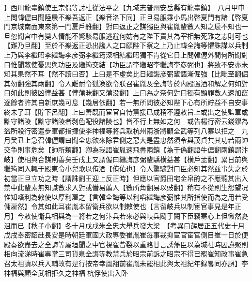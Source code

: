 】西川龍臺鎮使王宗侃等討杜從法平之【九域志普州安岳縣有龍臺鎮】　八月甲申上問韓偓曰聞陸扆不樂吾返正【樂音洛下同】正旦易服乘小馬出啓夏門有諸【啓夏門京城南面東來第一門夏戶雅翻】對曰返正之謀獨臣與崔胤輩數人知之扆不知也一旦忽聞宫中有變人情能不驚駭易服逃避何妨有之陛下責其為宰相無死難之志則可也【難乃旦翻】至於不樂返正恐出讒人之口願陛下察之上乃止韓全誨等懼誅謀以兵制上乃與李繼昭李繼誨李彦弼李繼筠深相結繼昭獨不肯從它日上問韓偓外間何所聞對曰惟聞敕使憂愳與功臣及繼筠交結【功臣謂李繼昭李繼誨李彦弼也】將致不安亦未知其果然不耳【然不讀曰否】上曰是不虛矣比日繼誨彦弼輩語漸倔強【比毗至翻倔其勿翻強其兩翻】令人難耐令狐渙欲令朕召崔胤及全誨等於内殿置酒和解之何如對曰如此則彼凶悖益甚【悖蒲昧翻又蒲没翻】上曰為之奈何對曰獨有顯罪數人速加竄逐餘者許其自新庶幾可息【幾居依翻】若一無所問彼必知陛下心有所貯益不自安事終未了耳【貯下呂翻】上曰善既而宦官自恃黨援已成稍不遵敕旨上或出之使監軍或黜守諸陵【黜守諸陵者剥色配役諸陵也】皆不行上無如之何　或告楊行密云錢鏐為盜所殺行密遣步軍都指揮使李神福等將兵取杭州兩浙將顧全武等列八寨以拒之　九月癸丑上急召韓偓謂曰聞全忠欲來除君側之惡大是盡忠然須令與茂貞共其功若兩帥交争則事危矣【帥所類翻】卿為我語崔胤速飛書兩鎮【為于偽翻語牛倨翻兩鎮謂汴岐】使相與合謀則善矣壬戌上又謂偓曰繼誨彦弼輩驕横益甚【横戶孟翻】累日前與繼筠同入輒于殿東令小兒歌以侑酒【侑佑也】令人驚駭對曰臣必知其然兹事失之於初當正旦立功之時【謂誅劉王迎上反正時】但應以官爵田宅金帛酧之不應聽其出入禁中此輩素無知識數求入對或僭易薦人【數所角翻易以䜴翻】稍有不從則生怨望况惟知嗜利為敕使以厚利雇之【言韓全誨等以利㗖繼誨彦弼惟其所指使而為之用若受傭雇然】令其如此耳崔胤本留衛兵欲以制敕使也【言留岐兵以制宦官事見是年正月】今敕使衛兵相與為一將若之何汴兵若來必與岐兵鬭于闕下臣竊寒心上但愀然憂沮而已【秋子小翻】冬十月戊戌朱全忠大舉兵發大梁　【考異曰薛居正五代史十月戊戌奉密詔赴長安是時朝廷軍國大政專委崔胤崔每事裁抑宦官宦官側目崔一日於便殿奏欲盡去之全誨等屬垣聞之中官視崔眥裂以重賂甘言誘藩臣以為城社時因讌聚則相向流涕時崔專掌三司貨泉全誨等教禁兵於昭宗前訴之昭宗不得已罷崔知政事崔急召太祖請以兵入輔故有是行按帝幸鳳翔前崔胤未罷相此與太祖紀年録畧同亦誤】李神福與顧全武相拒久之神福杭俘使出入卧

